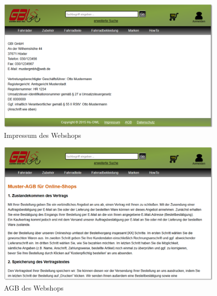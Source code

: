 \begin{figure}[H]
\begin{center}
\includegraphics[width=150mm]{Bilder/Abbildung6-ImpressumDesWebshops.png}
\end{center}
\caption{Impressum des Webshops}
\label{Abbildung6-Impressum des Webshops}
\end{figure}

\begin{figure}[H]
\begin{center}
\includegraphics[width=150mm]{Bilder/Abbildung7-AGBDesWebshops.png}
\end{center}
\caption{AGB des Webshops}
\label{Abbildung7-AGB des Webshops}
\end{figure}

